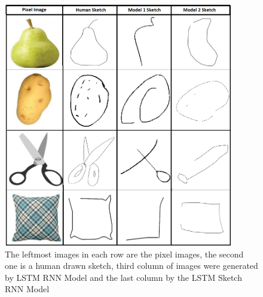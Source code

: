 \documentclass{article}
\begin{document}


\begin{figure}[]
\centering
\includegraphics[width=10cm]{images/image.png}
\caption{The leftmost images in each row are the pixel images, the second one is a human drawn sketch, third column of images were generated by LSTM RNN Model and the last column by the LSTM Sketch RNN Model}
\label{fig:sketches}
\end{figure}
\end{document}
